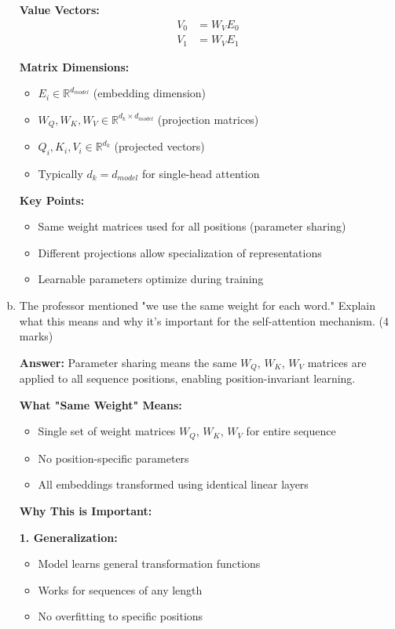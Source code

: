 \documentclass[12pt]{article}
\newcommand{\answer}[1]{{\color{answercolor}\textbf{Answer:} #1}}
\newcommand{\explanation}[1]{{\color{explanationcolor}#1}}
\begin{document}
\begin{enumerate}[(a)]
{    \textbf{Value Vectors:}
    \begin{align}
        V_0 &= W_V E_0 \\
        V_1 &= W_V E_1
    \end{align}
    
    \textbf{Matrix Dimensions:}
    \begin{itemize}
        \item $E_i \in \mathbb{R}^{d_{model}}$ (embedding dimension)
        \item $W_Q, W_K, W_V \in \mathbb{R}^{d_k \times d_{model}}$ (projection matrices)
        \item $Q_i, K_i, V_i \in \mathbb{R}^{d_k}$ (projected vectors)
        \item Typically $d_k = d_{model}$ for single-head attention
    \end{itemize}
    
    \textbf{Key Points:}
    \begin{itemize}
        \item Same weight matrices used for all positions (parameter sharing)
        \item Different projections allow specialization of representations
        \item Learnable parameters optimize during training
    \end{itemize}
    }
    
    \item The professor mentioned "we use the same weight for each word." Explain what this means and why it's important for the self-attention mechanism. \hfill (4 marks)
    
    \answer{Parameter sharing means the same $W_Q$, $W_K$, $W_V$ matrices are applied to all sequence positions, enabling position-invariant learning.}
    
    \explanation{
    \textbf{What "Same Weight" Means:}
    \begin{itemize}
        \item Single set of weight matrices $W_Q$, $W_K$, $W_V$ for entire sequence
        \item No position-specific parameters
        \item All embeddings transformed using identical linear layers
    \end{itemize}
    
    \textbf{Why This is Important:}
    
    \textbf{1. Generalization:}
    \begin{itemize}
        \item Model learns general transformation functions
        \item Works for sequences of any length
        \item No overfitting to specific positions
    \end{itemize}
    
}
\end{enumerate}
\end{document}
